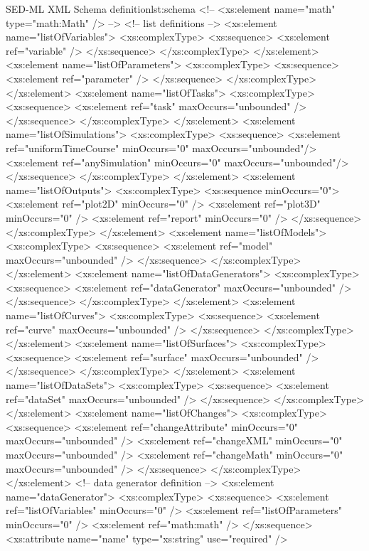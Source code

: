 \begin{myXmlLst}{SED-ML XML Schema definition}{lst:schema}
<!--  <xs:element name="math" type="math:Math" /> -->
<!-- list definitions -->
<xs:element name="listOfVariables">
 <xs:complexType>
  <xs:sequence>
   <xs:element ref="variable" />
  </xs:sequence>
 </xs:complexType>
</xs:element>
<xs:element name="listOfParameters">
 <xs:complexType>
  <xs:sequence>
   <xs:element ref="parameter" />
  </xs:sequence>
 </xs:complexType>
</xs:element>
<xs:element name="listOfTasks">
 <xs:complexType>
  <xs:sequence>
   <xs:element ref="task" maxOccurs="unbounded" />
  </xs:sequence>
 </xs:complexType>
</xs:element>
<xs:element name="listOfSimulations">
 <xs:complexType>
  <xs:sequence>
   <xs:element ref="uniformTimeCourse" minOccurs="0" maxOccurs="unbounded"/>
   <xs:element ref="anySimulation" minOccurs="0" maxOccurs="unbounded"/>
  </xs:sequence>
 </xs:complexType>
</xs:element>
<xs:element name="listOfOutputs">
 <xs:complexType>
  <xs:sequence minOccurs="0">
   <xs:element ref="plot2D" minOccurs="0" />
   <xs:element ref="plot3D" minOccurs="0" />
   <xs:element ref="report" minOccurs="0" />
  </xs:sequence>
 </xs:complexType>
</xs:element>
<xs:element name="listOfModels">
 <xs:complexType>
  <xs:sequence>
   <xs:element ref="model" maxOccurs="unbounded" />
  </xs:sequence>
 </xs:complexType>
</xs:element>
<xs:element name="listOfDataGenerators">
 <xs:complexType>
  <xs:sequence>
   <xs:element ref="dataGenerator" maxOccurs="unbounded" />
  </xs:sequence>
 </xs:complexType>
</xs:element>
<xs:element name="listOfCurves">
 <xs:complexType>
  <xs:sequence>
   <xs:element ref="curve" maxOccurs="unbounded" />
  </xs:sequence>
 </xs:complexType>
</xs:element>
<xs:element name="listOfSurfaces">
 <xs:complexType>
  <xs:sequence>
   <xs:element ref="surface" maxOccurs="unbounded" />
  </xs:sequence>
 </xs:complexType>
</xs:element>
<xs:element name="listOfDataSets">
 <xs:complexType>
  <xs:sequence>
   <xs:element ref="dataSet" maxOccurs="unbounded" />
  </xs:sequence>
 </xs:complexType>
</xs:element>
<xs:element name="listOfChanges">
 <xs:complexType>
  <xs:sequence>
   <xs:element ref="changeAttribute" minOccurs="0" maxOccurs="unbounded" />
   <xs:element ref="changeXML" minOccurs="0" maxOccurs="unbounded" />
   <xs:element ref="changeMath" minOccurs="0" maxOccurs="unbounded" />
  </xs:sequence>
 </xs:complexType>
</xs:element>
<!-- data generator definition -->
<xs:element name="dataGenerator">
 <xs:complexType>
  <xs:sequence>
   <xs:element ref="listOfVariables" minOccurs="0" />
   <xs:element ref="listOfParameters" minOccurs="0" />
   <xs:element ref="math:math" />
  </xs:sequence>
  <xs:attribute name="name" type="xs:string" use="required" />

\end{myXmlLst}
